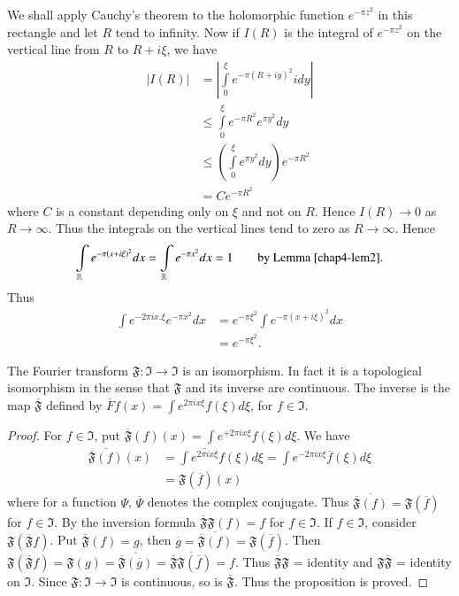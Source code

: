 We shall apply Cauchy's theorem to the holomorphic function $e^{-\pi
  z^{2}}$ in this rectangle and let $R$ tend to infinity. Now if
$I(R)$ is the integral of $e^{-\pi z^{2}}$ on the vertical line from
$R$ to $R+i\xi$, we have
\begin{align*}
|I(R)| &= \left|\int\limits^{\xi}_{0}e^{-\pi
  (R+iy)^{2}} idy \right|\\[4pt]
&\leq \int\limits^{\xi}_{0}e^{-\pi R^{2}}e^{\pi y^{2}}dy\\[4pt]
&\leq \left(\int\limits^{\xi}_{0}e^{\pi y^{2}}dy\right)e^{-\pi
    R^{2}}\\[4pt]
&= C e^{-\pi R^{2}}
\end{align*}
where $C$ is a constant depending only on $\xi$ and not on $R$. Hence
$I(R)\to 0$ as $R\to \infty$. Thus the integrals on the vertical lines
tend to zero as $R\to \infty$. Hence
$$
\int\limits_{\mathbb{R}}e^{-\pi
  (x+i\xi)^{2}}dx=\int\limits_{\mathbb{R}}e^{-\pi
  x^{2}}dx=1\qquad\text{by Lemma \ref{chap4-lem2}.}
$$\pageoriginale
Thus
\begin{align*}
\int e^{-2\pi ix.\xi}e^{-\pi x^{2}}dx &= e^{-\pi \xi^{2}}\int e^{-\pi
  (x+i\xi)^{2}}dx\\[4pt]
&= e^{-\pi \xi^{2}}.
\end{align*}

\begin{proposition}\label{chap4-prop7}
The Fourier transform $\mathfrak{F}:\mathfrak{I}\to \mathfrak{I}$ is
an isomorphism. In fact it is a topological isomorphism in the sense
that $\mathfrak{F}$ and its inverse are continuous. The inverse is the
map $\overline{\mathfrak{F}}$ defined by $\overline{F}f(x)=\int
e^{2\pi ix\xi}f(\xi)d\xi$, for $f\in \mathfrak{I}$.
\end{proposition}

\begin{proof}
For $f\in \mathfrak{I}$, put $\overline{\mathfrak{F}}(f)(x)=\int
e^{+2\pi ix\xi}f(\xi)d\xi$. We have
\begin{align*}
\overline{\overline{\mathfrak{F}}(f)}(x) &= \int \overline{e^{2\pi
      ix\xi}}f(\xi)d\xi = \int e^{-2\pi
    ix\xi}\overline{f}(\xi)d\xi\\[4pt]
&= \mathfrak{F}(\overline{f})(x)
\end{align*}
where for a function $\Psi$, $\overline{\Psi}$ denotes the complex
conjugate. Thus
$\overline{\overline{\mathfrak{F}}(f)}=\mathfrak{F}(\overline{f})$ for
$f\in \mathfrak{I}$. By the inversion formula
$\overline{\mathfrak{F}}\mathfrak{F}(f)=f$ for $f\in \mathfrak{I}$. If
$f\in \mathfrak{I}$, consider
$\mathfrak{F}(\overline{\mathfrak{F}}f)$. Put
$\overline{\mathfrak{F}}(f)=g$, then
$\overline{g}=\overline{\overline{\mathfrak{F}}(f)}=\mathfrak{F}(\overline{f})$. Then
$\mathfrak{F}(\overline{\mathfrak{F}}f)=\mathfrak{F}(g)=\overline{\overline{\mathfrak{F}}(\overline{g})}=\overline{\overline{\mathfrak{F}}\mathfrak{F}(\overline{f})}=f$. Thus
  $\overline{\mathfrak{F}}\mathfrak{F}$ = identity and
  $\mathfrak{F}\overline{\mathfrak{F}}$ =  identity on
  $\mathfrak{I}$. Since $\mathfrak{F}:\mathfrak{I}\to \mathfrak{I}$ is
  continuous, so is $\overline{\mathfrak{F}}$. Thus the proposition is proved.
\end{proof}

